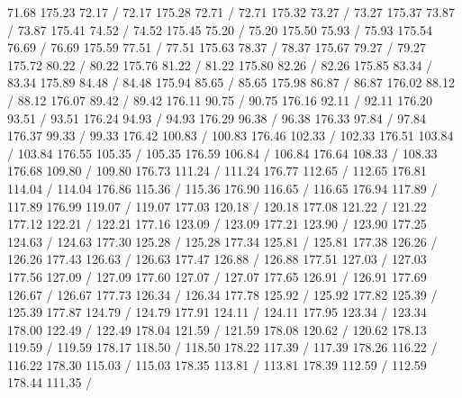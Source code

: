 { 71.68 175.23 72.17 /
 72.17 175.28 72.71 /
 72.71 175.32 73.27 /
 73.27 175.37 73.87 /
 73.87 175.41 74.52 /
 74.52 175.45 75.20 /
 75.20 175.50 75.93 /
 75.93 175.54 76.69 /
 76.69 175.59 77.51 /
 77.51 175.63 78.37 /
 78.37 175.67 79.27 /
 79.27 175.72 80.22 /
 80.22 175.76 81.22 /
 81.22 175.80 82.26 /
 82.26 175.85 83.34 /
 83.34 175.89 84.48 /
 84.48 175.94 85.65 /
 85.65 175.98 86.87 /
 86.87 176.02 88.12 /
 88.12 176.07 89.42 /
 89.42 176.11 90.75 /
 90.75 176.16 92.11 /
 92.11 176.20 93.51 /
 93.51 176.24 94.93 /
 94.93 176.29 96.38 /
 96.38 176.33 97.84 /
 97.84 176.37 99.33 /
 99.33 176.42 100.83 /
 100.83 176.46 102.33 /
 102.33 176.51 103.84 /
 103.84 176.55 105.35 /
 105.35 176.59 106.84 /
 106.84 176.64 108.33 /
 108.33 176.68 109.80 /
 109.80 176.73 111.24 /
 111.24 176.77 112.65 /
 112.65 176.81 114.04 /
 114.04 176.86 115.36 /
 115.36 176.90 116.65 /
 116.65 176.94 117.89 /
 117.89 176.99 119.07 /
 119.07 177.03 120.18 /
 120.18 177.08 121.22 /
 121.22 177.12 122.21 /
 122.21 177.16 123.09 /
 123.09 177.21 123.90 /
 123.90 177.25 124.63 /
 124.63 177.30 125.28 /
 125.28 177.34 125.81 /
 125.81 177.38 126.26 /
 126.26 177.43 126.63 /
 126.63 177.47 126.88 /
 126.88 177.51 127.03 /
 127.03 177.56 127.09 /
 127.09 177.60 127.07 /
 127.07 177.65 126.91 /
 126.91 177.69 126.67 /
 126.67 177.73 126.34 /
 126.34 177.78 125.92 /
 125.92 177.82 125.39 /
 125.39 177.87 124.79 /
 124.79 177.91 124.11 /
 124.11 177.95 123.34 /
 123.34 178.00 122.49 /
 122.49 178.04 121.59 /
 121.59 178.08 120.62 /
 120.62 178.13 119.59 /
 119.59 178.17 118.50 /
 118.50 178.22 117.39 /
 117.39 178.26 116.22 /
 116.22 178.30 115.03 /
 115.03 178.35 113.81 /
 113.81 178.39 112.59 /
 112.59 178.44 111.35 /
}
